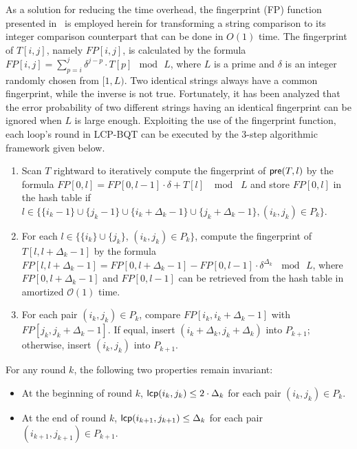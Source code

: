 \documentclass[10pt,journal,letterpaper,compsoc]{IEEEtran}
\begin{document}
\begin{CJK*}{GBK}{song}
As a solution for reducing the time overhead, the fingerprint (FP) function presented in~\cite{Karp1987} is employed herein for transforming a string comparison to its integer comparison counterpart that can be done in $O(1)$ time. The fingerprint of $T[i,j]$, namely $FP[i,j]$, is calculated by the formula $FP[i,j] = \sum_{p=i}^{j} \delta^{j-p} \cdot T[p] \mod \, L$, where $L$ is a prime and $\delta$ is an integer randomly chosen from $[1,L)$. Two identical strings always have a common fingerprint, while the inverse is not true. Fortunately, it has been analyzed that the error probability of two different strings having an identical fingerprint can be ignored when $L$ is large enough. Exploiting the use of the fingerprint function, each loop's round in LCP-BQT can be executed by the 3-step algorithmic framework given below.

\begin{enumerate}
\item Scan $T$ rightward to iteratively compute the fingerprint of ${\sf pre}(T,l)$ by the formula $FP[0,l] = FP[0,l-1] \cdot \delta + T[l] \,\, \mod \,\, L$ and store $FP[0,l]$ in the hash table if $l\in \{ \{i_k-1\}\cup\{j_k-1\}\cup\{i_k +\Delta_{k} - 1\}\cup\{j_k+ \Delta_{k} - 1\},(i_k,j_k)\in P_k\}$.
\item For each $l\in \{\{i_k\}\cup \{j_k\}$, $(i_k,j_k)\in P_k\}$, compute the fingerprint of $T[l,l+\Delta_{k} - 1]$ by the formula $FP[l,l+ \Delta_{k} - 1]=FP[0,l+ \Delta_{k} - 1] - FP[0,l-1] \cdot \delta^{\Delta_{k}} \, \mod \, L$, where $FP[0,l+ \Delta_{k} - 1]$ and $FP[0,l-1]$ can be retrieved from the hash table in amortized $\mathcal{O}(1)$ time.
\item For each pair $(i_k,j_k)\in P_k$, compare $FP[i_k,i_k+\Delta_{k} - 1]$ with $FP[j_k,j_k+\Delta_{k} - 1]$. If equal, insert $(i_k+\Delta_{k},j_k+\Delta_{k})$ into $P_{k+1}$; otherwise, insert $(i_k, j_k)$ into $P_{k+1}$.
\end{enumerate}

For any round $k$, the following two properties remain invariant:

\begin{itemize}
\item At the beginning of round $k$, ${\sf lcp}(i_k,j_k) \le 2 \cdot \Delta_{k}$ for each pair $(i_k,j_k) \in P_k$.
\item At the end of round $k$, ${\sf lcp}(i_{k+1},j_{k+1}) \le \Delta_{k}$ for each pair $(i_{k+1},j_{k+1}) \in P_{k+1}$.
\end{itemize}


\end{CJK*}
\end{document}
